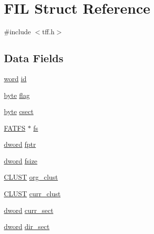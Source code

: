 \hypertarget{struct_f_i_l}{\section{F\-I\-L Struct Reference}
\label{struct_f_i_l}
}


{\ttfamily \#include $<$tff.\-h$>$}

\subsection*{Data Fields}
\begin{DoxyCompactItemize}
\item 
\hyperlink{p8_2pinguino_2core_2typedef_8h_abad51e07ab6d26bec9f1f786c8d65bcd}{word} \hyperlink{struct_f_i_l_a588688f55d57bf8a7e8c1d2cf88a3c56}{id}
\item 
\hyperlink{p8_2pinguino_2core_2typedef_8h_a0c8186d9b9b7880309c27230bbb5e69d}{byte} \hyperlink{struct_f_i_l_ae84669505a47c55d6246560a290a298d}{flag}
\item 
\hyperlink{p8_2pinguino_2core_2typedef_8h_a0c8186d9b9b7880309c27230bbb5e69d}{byte} \hyperlink{struct_f_i_l_ae338a94c0232319659d442df5676325d}{csect}
\item 
\hyperlink{struct_f_a_t_f_s}{F\-A\-T\-F\-S} $\ast$ \hyperlink{struct_f_i_l_a472e3612956e3ffb3ab823c37ca33250}{fs}
\item 
\hyperlink{p8_2pinguino_2core_2typedef_8h_a74cb93d430006e784da73b8ca406ee6e}{dword} \hyperlink{struct_f_i_l_a5afdaf3451d484cc97e07228b775ccf1}{fptr}
\item 
\hyperlink{p8_2pinguino_2core_2typedef_8h_a74cb93d430006e784da73b8ca406ee6e}{dword} \hyperlink{struct_f_i_l_a7582a0b3a658c0543f6cdc7585d84f7c}{fsize}
\item 
\hyperlink{tff_8h_af322b62389c843d5727de4796a09f59c}{C\-L\-U\-S\-T} \hyperlink{struct_f_i_l_a5203f761bacf25758b7e736215f74349}{org\-\_\-clust}
\item 
\hyperlink{tff_8h_af322b62389c843d5727de4796a09f59c}{C\-L\-U\-S\-T} \hyperlink{struct_f_i_l_a32da77ccc2ccbe19278c7889417fb9a3}{curr\-\_\-clust}
\item 
\hyperlink{p8_2pinguino_2core_2typedef_8h_a74cb93d430006e784da73b8ca406ee6e}{dword} \hyperlink{struct_f_i_l_a36b8981ac0c7cca7ef120e739f29a3e1}{curr\-\_\-sect}
\item 
\hyperlink{p8_2pinguino_2core_2typedef_8h_a74cb93d430006e784da73b8ca406ee6e}{dword} \hyperlink{struct_f_i_l_ac40d4a51f8f940e6154d364c45935278}{dir\-\_\-sect}
\item 

\end{DoxyCompactItemize}
